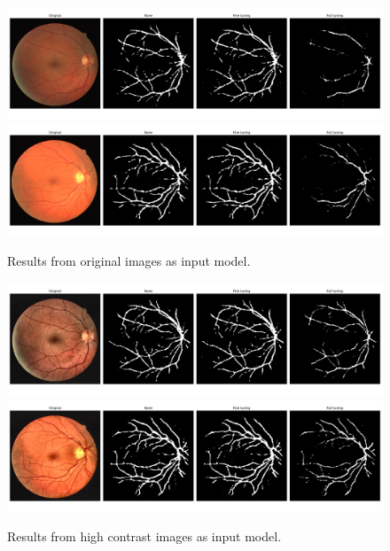 \begin{frame}
  \begin{figure}[H]
    \includegraphics[width=13cm]{Graphics/normal/04.png}
    \includegraphics[width=13cm]{Graphics/normal/14.png}
    \caption{Results from original images as input model.}
  \end{figure}
\end{frame}

\begin{frame}
  \begin{figure}[H]
    \includegraphics[width=13cm]{Graphics/high_contrast/04.png}
    \includegraphics[width=13cm]{Graphics/high_contrast/14.png}
    \caption{Results from high contrast images as input model.}
  \end{figure}
\end{frame}

